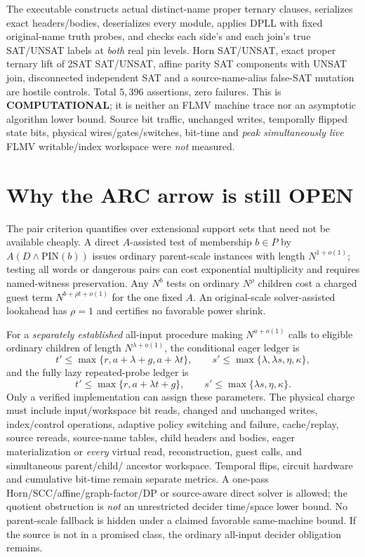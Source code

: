 \documentclass[11pt]{article}
\begin{document}
The executable constructs actual distinct-name proper ternary
clauses, serializes exact headers/bodies, deserializes every
module, applies DPLL with fixed original-name truth probes,
and checks each side's and each join's true SAT/UNSAT labels
at \emph{both} real pin levels. Horn SAT/UNSAT, exact proper
ternary lift of 2SAT SAT/UNSAT, affine parity SAT components
with UNSAT join, disconnected independent SAT and a
source-name-alias false-SAT mutation are hostile controls.
Total $5{,}396$ assertions, zero failures. This is
\textbf{COMPUTATIONAL}; it is neither an FLMV machine trace
nor an asymptotic algorithm lower bound. Source bit traffic,
unchanged writes, temporally flipped state bits, physical
wires/gates/switches, bit-time and \emph{peak simultaneously
live} FLMV writable/index workspace were \emph{not} measured.

\section{Why the ARC arrow is still OPEN}
The pair criterion quantifies over extensional support sets that
need not be available cheaply. A direct $A$-assisted test of
membership $b\in P$ by $A(D\wedge\mathrm{PIN}(b))$
issues ordinary parent-scale instances with length
$N^{1+o(1)}$; testing all words or dangerous pairs can cost
exponential multiplicity and requires named-witness preservation.
Any $N^b$ tests on ordinary $N^\rho$ children cost a
charged guest term $N^{b+\rho t+o(1)}$ for the one fixed $A$.
An original-scale solver-assisted lookahead has $\rho=1$
and certifies no favorable power shrink.

For a \emph{separately established} all-input procedure
making $N^{a+o(1)}$ calls to eligible ordinary children
of length $N^{\lambda+o(1)}$, the conditional eager ledger is
\[
 t'\le\max\{r,a+\lambda+g,a+\lambda t\},\qquad
 s'\le\max\{\lambda,\lambda s,\eta,\kappa\},
\]
and the fully lazy repeated-probe ledger is
\[
 t'\le\max\{r,a+\lambda t+g\},\qquad
 s'\le\max\{\lambda s,\eta,\kappa\}.
\]
Only a verified implementation can assign these parameters.
The physical charge must include input/workspace bit reads,
changed and unchanged writes, index/control operations,
adaptive policy switching and failure, cache/replay,
source rereads, source-name tables, child headers and bodies,
eager materialization or \emph{every} virtual read,
reconstruction, guest calls, and simultaneous parent/child/
ancestor workspace. Temporal flips, circuit hardware and
cumulative bit-time remain separate metrics.
A one-pass Horn/SCC/affine/graph-factor/DP or source-aware
direct solver is allowed; the quotient obstruction is
\emph{not} an unrestricted decider time/space lower bound.
No parent-scale fallback is hidden under a claimed favorable
same-machine bound. If the source is not in a promised class,
the ordinary all-input decider obligation remains.
\end{document}
